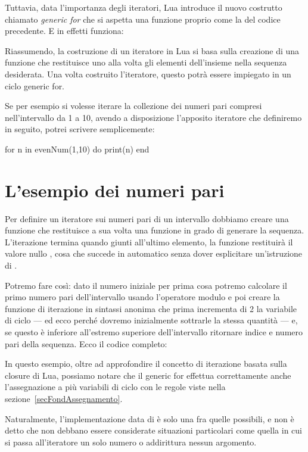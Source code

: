 Tuttavia, data l'importanza degli iteratori, Lua introduce il nuovo costrutto
chiamato \emph{generic for} che si aspetta una funzione proprio come la
 del codice precedente. E in effetti funziona:

Riassumendo, la costruzione di un iteratore in Lua si basa sulla creazione di
una funzione che restituisce uno alla volta gli elementi dell'insieme nella
sequenza desiderata. Una volta costruito l'iteratore, questo potrà essere
impiegato in un ciclo generic for.

Se per esempio si volesse iterare la collezione dei numeri pari compresi
nell'intervallo da 1 a 10, avendo a disposizione l'apposito iteratore
 che definiremo in seguito, potrei scrivere semplicemente:
\begin{lines}
for n in evenNum(1,10) do
    print(n)
end
\end{lines}


\section{L'esempio dei numeri pari}

Per definire un iteratore sui numeri pari di un intervallo dobbiamo creare una
funzione che restituisce a sua volta una funzione in grado di generare la
sequenza. L'iterazione termina quando giunti all'ultimo elemento, la funzione
restituirà il valore nullo , cosa che succede in automatico senza dover
esplicitare un'istruzione di .

Potremo fare così: dato il numero iniziale per prima cosa potremo calcolare il
primo numero pari dell'intervallo usando l'operatore modulo \key{\%} e poi
creare la funzione di iterazione in sintassi anonima che prima incrementa di 2
la variabile di ciclo --- ed ecco perché dovremo inizialmente sottrarle la
stessa quantità --- e, se questo è inferiore all'estremo superiore
dell'intervallo ritornare indice e numero pari della sequenza. Ecco il codice
completo:

In questo esempio, oltre ad approfondire il concetto di iterazione basata sulla
closure di Lua, possiamo notare che il generic for effettua correttamente anche
l'assegnazione a più variabili di ciclo con le regole viste nella
sezione~\ref{secFondAssegnamento}.

Naturalmente, l'implementazione data di  è solo una fra quelle
possibili, e non è detto che non debbano essere considerate situazioni
particolari come quella in cui si passa all'iteratore un solo numero o
addirittura nessun argomento.


